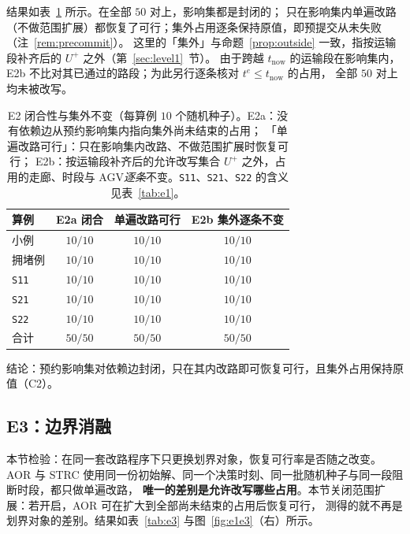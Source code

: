 \documentclass[manuscript,screen,review]{acmart}
\providecommand{\STRC}{\textsc{STRC}}
\newcommand{\NSeeds}{10}
\newcommand{\NPairs}{50}
\newcommand{\PassClosed}{\NPairs/\NPairs}    %
\newcommand{\PassInvar}{\NPairs/\NPairs}     %
\begin{document}
结果如表~\ref{tab:e2} 所示。在全部 \(\NPairs\) 对上，影响集都是封闭的；
只在影响集内单遍改路（不做范围扩展）都恢复了可行；集外占用逐条保持原值，即预提交从未失败（注~\ref{rem:precommit}）。
这里的「集外」与命题~\ref{prop:outside} 一致，指按运输段补齐后的 \(U^{+}\) 之外（第~\ref{sec:level1}~节）。
由于跨越 \(t_{\mathrm{now}}\) 的运输段在影响集内，E2b 不比对其已通过的路段；为此另行逐条核对 \(t^e\le t_{\mathrm{now}}\) 的占用，
全部 \(\NPairs\) 对上均未被改写。

\begin{table}[t]
\centering
\caption{E2 闭合性与集外不变（每算例 \(\NSeeds\) 个随机种子）。E2a：没有依赖边从预约影响集内指向集外尚未结束的占用；
「单遍改路可行」：只在影响集内改路、不做范围扩展时恢复可行；
E2b：按运输段补齐后的允许改写集合 \(U^{+}\) 之外，占用的走廊、时段与 AGV\emph{逐条}不变。\texttt{S11}、\texttt{S21}、\texttt{S22} 的含义见表~\ref{tab:e1}。}
\label{tab:e2}
\small
\begin{tabular}{@{}lccc@{}}
\toprule
算例 & E2a 闭合 & 单遍改路可行 & E2b 集外逐条不变 \\
\midrule
小例   & \(10/10\) & \(10/10\) & \(10/10\) \\
拥堵例 & \(10/10\) & \(10/10\) & \(10/10\) \\
\texttt{S11}  & \(10/10\) & \(10/10\) & \(10/10\) \\
\texttt{S21}    & \(10/10\) & \(10/10\) & \(10/10\) \\
\texttt{S22}     & \(10/10\) & \(10/10\) & \(10/10\) \\
\midrule
合计 & \(\PassClosed\) & \(\NPairs/\NPairs\) & \(\PassInvar\) \\
\bottomrule
\end{tabular}
\end{table}

结论：预约影响集对依赖边封闭，只在其内改路即可恢复可行，且集外占用保持原值（C2）。

\subsection{E3：边界消融}
\label{sec:e3}

本节检验：在同一套改路程序下只更换划界对象，恢复可行率是否随之改变。
AOR 与 \STRC{} 使用同一份初始解、同一个决策时刻、同一批随机种子与同一段阻断时段，都只做单遍改路，
\textbf{唯一的差别是允许改写哪些占用}。本节关闭范围扩展：若开启，AOR 可在扩大到全部尚未结束的占用后恢复可行，
测得的就不再是划界对象的差别。结果如表~\ref{tab:e3} 与图~\ref{fig:e1e3}（右）所示。
\end{document}
